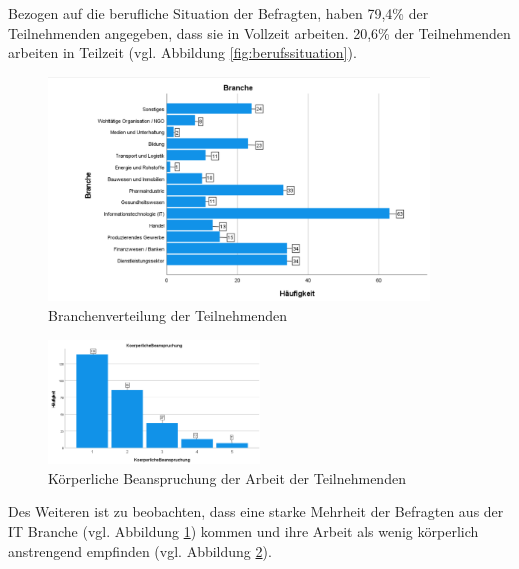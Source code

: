 Bezogen auf die berufliche Situation der Befragten, haben 79,4\% der Teilnehmenden angegeben, dass sie in 
Vollzeit arbeiten. 20,6\% der Teilnehmenden arbeiten in Teilzeit (vgl. Abbildung \ref{fig:berufssituation}).

\begin{figure}[h]
    \centering
    \includegraphics[width=0.9\textwidth]{04_Artefakte/01_Abbildungen/deskriptiv_branche.png}
    \caption{Branchenverteilung der Teilnehmenden}
    \label{fig:branche} 
\end{figure}

\begin{figure}[h]
    \centering
    \includegraphics[width=0.5\textwidth]{04_Artefakte/01_Abbildungen/deskriptiv_koerperliche_beanspruchung.png}
    \caption{Körperliche Beanspruchung der Arbeit der Teilnehmenden}
    \label{fig:koerperliche_beanspruchung}
\end{figure}
Des Weiteren ist zu beobachten, dass eine starke Mehrheit der Befragten aus der IT Branche (vgl. Abbildung \ref{fig:branche}) 
kommen und ihre Arbeit als wenig körperlich anstrengend empfinden (vgl. Abbildung \ref{fig:koerperliche_beanspruchung}).

